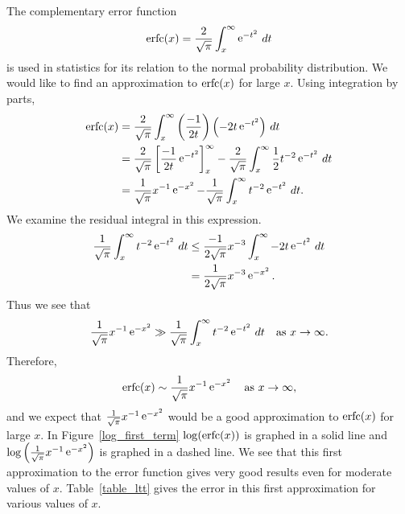 \begin{Example}
  \label{error_function}
  The complementary error function
  \[ \mathop{\mathrm{erfc}}\nolimits(x) = \frac{2}{\sqrt{\pi}} \int_x^\infty \mathop{\mathrm{e}}\nolimits^{-t^2}\,dt\]
  is used in statistics for its relation to the normal probability distribution.
  We would like to find an approximation to $\mathop{\mathrm{erfc}}\nolimits(x)$ for large $x$.
  Using integration by parts,
  \begin{align*}
    \mathop{\mathrm{erfc}}\nolimits(x)
    &= \frac{2}{\sqrt{\pi}}\int_x^\infty \left(\frac{-1}{2t}\right)
    \left(-2 t \mathop{\mathrm{e}}\nolimits^{-t^2}\right)\,dt \\
    &= \frac{2}{\sqrt{\pi}}\left[\frac{-1}{2t}\mathop{\mathrm{e}}\nolimits^{-t^2}\right]_x^\infty - 
    \frac{2}{\sqrt{\pi}}\int_x^\infty
    \frac{1}{2}t^{-2} \mathop{\mathrm{e}}\nolimits^{-t^2}\,dt \\
    &= \frac{1}{\sqrt{\pi}}x^{-1} \mathop{\mathrm{e}}\nolimits^{-x^2} - 
    \frac{1}{\sqrt{\pi}}\int_x^\infty t^{-2} \mathop{\mathrm{e}}\nolimits^{-t^2}\,dt. 
  \end{align*}
  We examine the residual integral in this expression.
  \begin{align*}
    \frac{1}{\sqrt{\pi}} \int_x^\infty t^{-2} \mathop{\mathrm{e}}\nolimits^{-t^2}\,dt
    &\leq \frac{-1}{2\sqrt{\pi}} x^{-3} \int_x^\infty -2t \mathop{\mathrm{e}}\nolimits^{-t^2}\,dt \\
    &= \frac{1}{2\sqrt{\pi}} x^{-3} \mathop{\mathrm{e}}\nolimits^{-x^2}.
  \end{align*}
  Thus we see that
  \[\frac{1}{\sqrt{\pi}}x^{-1} \mathop{\mathrm{e}}\nolimits^{-x^2} \gg 
  \frac{1}{\sqrt{\pi}}\int_x^\infty t^{-2} \mathop{\mathrm{e}}\nolimits^{-t^2}\,dt
  \quad \mathrm{as}\ x \to \infty. \]
  Therefore, 
  \[ \mathop{\mathrm{erfc}}\nolimits(x) \sim \frac{1}{\sqrt{\pi}} x^{-1} \mathop{\mathrm{e}}\nolimits^{-x^2}
  \quad \mathrm{as}\ x \to \infty,\]
  and we expect that $\frac{1}{\sqrt{\pi}}x^{-1} \mathop{\mathrm{e}}\nolimits^{-x^2}$ would
  be a good approximation to $\mathop{\mathrm{erfc}}\nolimits(x)$ for large $x$.
  In Figure~\ref{log_first_term} $\log(\mathop{\mathrm{erfc}}\nolimits(x))$ is graphed in a solid line and
  $\log\left(\frac{1}{\sqrt{\pi}} x^{-1}\mathop{\mathrm{e}}\nolimits^{-x^2}\right)$ 
  is graphed in a dashed line.
  We see that this first approximation to the error function gives very 
  good results even for moderate values of $x$.  Table~\ref{table_ltt} gives
  the error in this first approximation for various values of $x$.



\end{Example}
